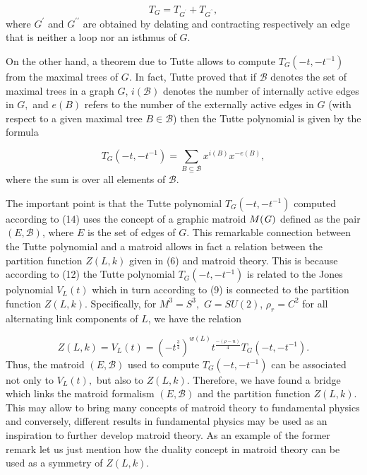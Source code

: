 \documentclass[a4paper,12pt]{article}
\begin{document}
\begin{equation}
T_{\mathit{G}}=T_{\mathit{G}^{^{\prime }}}+T_{\mathit{G}^{^{\prime \prime
}}},  \label{13}
\end{equation}
where $\mathit{G}^{\prime }$ and $\mathit{G}^{\prime \prime }$ are obtained
by delating and contracting respectively an edge that is neither a loop nor
an isthmus of $\mathit{G}$.

On the other hand, a theorem due to Tutte allows to compute $T_{\mathit{G}%
}(-t,-t^{-1})$ from the maximal trees of $\mathit{G}$. In fact, Tutte proved
that if $\mathcal{B}$ denotes the set of maximal trees in a graph $\mathit{G}
$, $i(\mathcal{B})$ denotes the number of internally active edges in $%
\mathit{G,}$ and $e(B)$ refers to the number of the externally active edges
in $\mathit{G}$ (with respect to a given maximal tree $B\in \mathcal{B}$)
then the Tutte polynomial is given by the formula

\begin{equation}
T_{\mathit{G}}(-t,-t^{-1})=\sum_{B\subseteq \mathcal{B}}x^{i(B)}x^{-e(B)},
\label{14}
\end{equation}
where the sum is over all elements of $\mathcal{B}$.

The important point is that the Tutte polynomial $T_{\mathit{G}}(-t,-t^{-1})$
computed according to (14) uses the concept of a graphic matroid $M(\mathit{%
G)}$ defined as the pair $(E,\mathcal{B})$, where $E$ is the set of edges of 
$\mathit{G}$. This remarkable connection between the Tutte polynomial and a
matroid allows in fact a relation between the partition function $Z(L,k)$
given in (6) and matroid theory. This is because according to (12) the Tutte
polynomial $T_{\mathit{G}}(-t,-t^{-1})$ is related to the Jones polynomial $%
V_{L}(t)$ which in turn according to (9) is connected to the partition
function $Z(L,k)$. Specifically, for $M^{3}=S^{3},$ $G=SU(2)$, $\rho
_{r}=C^{2}$ for all alternating link components of $L$, we have the relation

\begin{equation}
Z(L,k)=V_{L}(t)=(-t^{\frac{3}{4}})^{w(L)}t^{\frac{-(\rho -n)}{4}}T_{\mathit{G%
}}(-t,-t^{-1}).  \label{15}
\end{equation}
Thus, the matroid $(E,\mathcal{B})$ used to compute $T_{\mathit{G}%
}(-t,-t^{-1})$ can be associated not only to $V_{L}(t),$ but also to $%
Z(L,k). $ Therefore, we have found a bridge which links the matroid
formalism $(E,\mathcal{B})$ and the partition function $Z(L,k).$ This may
allow to bring many concepts of matroid theory to fundamental physics and
conversely, different results in fundamental physics may be used as an
inspiration to further develop matroid theory. As an example of the former
remark let us just mention how the duality concept in matroid theory can be
used as a symmetry of $Z(L,k).$
\end{document}
